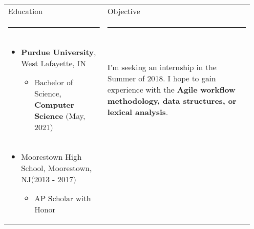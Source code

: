 \begin{tabular}{p{4.5in}|p{3in}}
	{\fontfamily{lmdh}\fontsize{24}{28.8}\selectfont Education} & {\fontfamily{lmdh}\fontsize{24}{28.8}\selectfont Objective}\\
	\rule{175pt}{2pt} & \rule{175pt}{2pt}\\
	\vspace{-10pt}
	\begin{itemize}
		\item \textbf{Purdue University}, West Lafayette, IN
		\begin{itemize}
			\item \vspace{-5pt}Bachelor of Science, \textbf{Computer Science} \hfill$($May, 2021$)$
		\end{itemize}
	\end{itemize}
	& I'm seeking an internship in the Summer of 2018. I hope to gain experience with the \textbf{Agile workflow methodology, data structures, or lexical analysis}.\\
	\vspace{-30pt}
	\begin{itemize}
		\item Moorestown High School, Moorestown, NJ\hfill$($2013 - 2017$)$
		\begin{itemize}
			\item \vspace{-5pt}AP Scholar with Honor
		\end{itemize}
	\end{itemize} & \\
\end{tabular}\\
\\